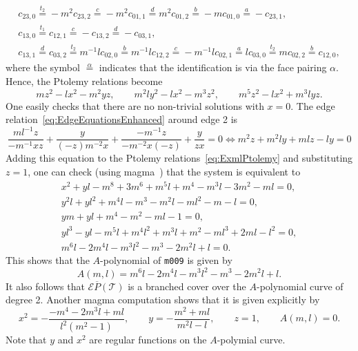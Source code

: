 \documentclass[11pt]{amsart}
\theoremstyle{plain}
\theoremstyle{definition}
\numberwithin{equation}{section}
\newcommand{\T}{\mathcal T}
\newcommand{\E}{\mathcal E}
\begin{document}
\begin{equation}
\begin{gathered}
c_{23,0}\overset{t_2}{=}-m^2c_{23,2}\overset{c}{=}-m^2c_{01,1}\overset{d}{=}m^2c_{01,2}\overset{b}{=}-mc_{01,0}\overset{a}{=}-c_{23,1},\\
c_{13,0}\overset{t_1}{=}c_{12,1}\overset{c}{=}-c_{13,2}\overset{d}{=}-c_{03,1},\\
c_{13,1}\overset{d}{=}c_{03,2}\overset{t_2}{=}m^{-1}lc_{02,0}\overset{b}{=}m^{-1}lc_{12,2}\overset{c}{=}-m^{-1}lc_{02,1}\overset{a}{=}lc_{03,0}\overset{t_2}{=}mc_{02,2}\overset{b}{=}c_{12,0},
\end{gathered}
\end{equation}
where the symbol $\overset{\alpha}{=}$ indicates that the identification is via the face pairing $\alpha$. Hence, the Ptolemy relations become
\begin{equation}\label{eq:ExmlPtolemy}
mz^2-lx^2-m^2yz,\qquad m^2ly^2-lx^2-m^3z^2,\qquad m^5z^2-lx^2+m^3lyz.
\end{equation}
One easily checks that there are no non-trivial solutions with $x=0$. The edge relation~\eqref{eq:EdgeEquationsEnhanced} around edge 2 is 
\begin{equation}
\frac{ml^{-1}z}{-m^{-1}xz}+\frac{y}{(-z)m^{-2}x}+\frac{-m^{-1}z}{-m^{-2}x(-z)}+\frac{y}{zx}=0\iff m^2z+m^2ly+mlz-ly=0
\end{equation}
Adding this equation to the Ptolemy relations~\eqref{eq:ExmlPtolemy} and substituting $z=1$, one can check (using magma~\cite{Magma}) that the system is equivalent to
\begin{equation}
\begin{gathered}
        x^2 + yl - m^8 + 3m^6 + m^5l + m^4 - m^3l - 3m^2 - ml=0,\\
        y^2l + yl^2 + m^4l - m^3 - m^2l - ml^2 - m - l=0,\\
        ym + yl + m^4 - m^2 - ml - 1=0,\\
        yl^3 - yl - m^5l + m^4l^2 + m^3l + m^2 - ml^3 + 2ml - l^2=0,\\
        m^6l - 2m^4l - m^3l^2 - m^3 - 2m^2l + l=0.
\end{gathered}
\end{equation}
This shows that the $A$-polynomial of \texttt{m009} is given by
\begin{equation}
A(m,l)=m^6l - 2m^4l - m^3l^2 - m^3 - 2m^2l + l.
\end{equation}
It also follows that $\E\overline P(\T)$ is a branched cover over the $A$-polynomial curve of degree 2. Another magma computation shows that it is given explicitly by
\begin{equation}\label{eq:EPOverA}
x^2=-\frac{-m^4-2m^3l+ml}{l^2(m^2-1)},\qquad y=-\frac{m^2+ml}{m^2l - l},\qquad z=1,\qquad A(m,l)=0.
\end{equation}
Note that $y$ and $x^2$ are regular functions on the $A$-polymial curve.
\end{document}
